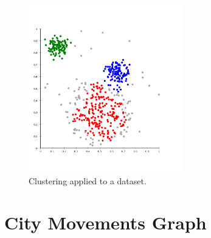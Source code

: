 \begin{figure}[!ht]
	\centering
	\includegraphics[width=0.6\textwidth]{images/clustering.png}
	\caption{ Clustering applied to a dataset. }
	\label{fig:clustering}
\end{figure} 



\FloatBarrier
\section{City Movements Graph}

\FloatBarrier